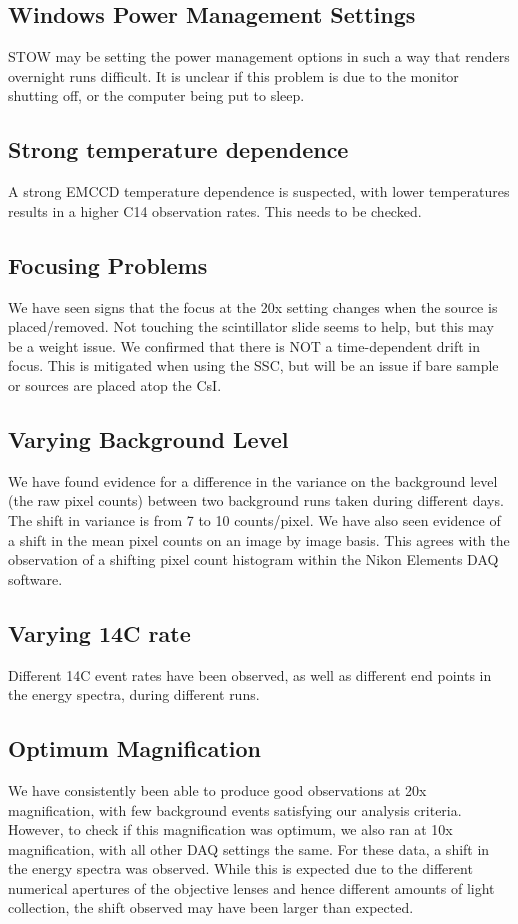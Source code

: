 \documentclass[11pt]{article}
\begin{document}
\subsection{Windows Power Management Settings}
STOW may be setting the power management options in such a way that renders overnight runs difficult. It is unclear if this problem is due to the monitor shutting off, or the computer being put to sleep.


\subsection{Strong temperature dependence}
A strong EMCCD temperature dependence is suspected, with lower temperatures results in a higher C14 observation rates. This needs to be checked. 

\subsection{Focusing Problems}
We have seen signs that the focus at the 20x setting changes when the source is placed/removed. Not touching the scintillator slide seems to help, but this may be a weight issue.
We confirmed that there is NOT a time-dependent drift in focus. This is mitigated when using the SSC, but will be an issue if bare sample or sources are placed atop the CsI. 

\subsection{Varying Background Level}
We have found evidence for a difference in the variance on the background level (the raw pixel counts) between two background runs taken during different days. 
The shift in variance is from 7 to 10 counts/pixel. We have also seen evidence of a shift in the mean pixel counts on an image by image basis. This agrees with
the observation of a shifting pixel count histogram within the Nikon Elements DAQ software.

\subsection{Varying 14C rate}
Different 14C event rates have been observed, as well as different end points in the energy spectra, during different runs. 


\subsection{Optimum Magnification}
We have consistently been able to produce good observations at 20x magnification, with few background events satisfying our analysis criteria. However, to check if this magnification was optimum, we also ran at 10x magnification, with all other DAQ settings the same. For these data, a shift in the energy spectra was observed. While this is expected due to the different numerical apertures of the objective lenses and hence different amounts of light collection, the shift observed may have been larger than expected. 
\end{document}
